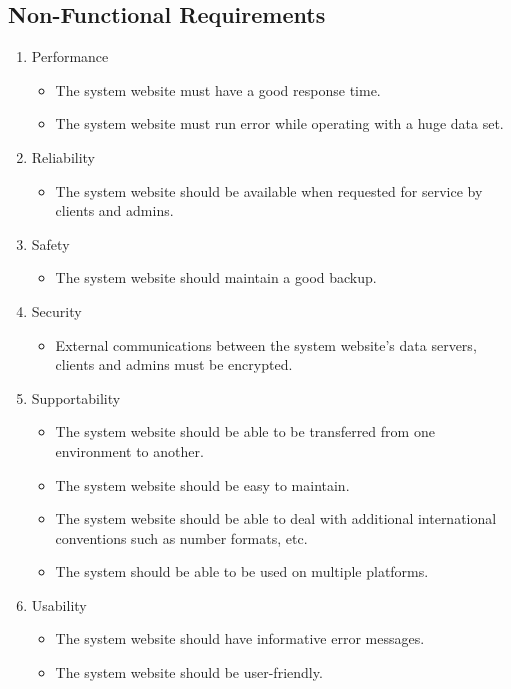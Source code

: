 \subsection{Non-Functional Requirements}
	\begin{enumerate}
	\item Performance
		\begin{itemize}
		\item The system website must have a good response time.
		\item The system website must run error while operating with a huge data set.  
		\end{itemize}
	\item Reliability
		\begin{itemize}
		\item The system website should be available when requested for service by clients and admins. 
		\end{itemize}
	\item Safety 
		\begin{itemize}
		\item The system website should maintain a good backup.  
		\end{itemize}
	\item Security
		\begin{itemize}
		\item External communications between the system website’s data servers, clients and admins must be encrypted. 
		\end{itemize}
	\item Supportability
		\begin{itemize}
		\item The system website should be able to be transferred from one environment to another. 
		\item The system website should be easy to maintain. 
		\item The system website should be able to deal with additional international conventions such as number formats, etc. 
		\item The system should be able to be used on multiple platforms.  
		\end{itemize}
	\item Usability
		\begin{itemize}
		\item The system website should have informative error messages. 
		\item The system website should be user-friendly. 
		\end{itemize}
	\end{enumerate}

